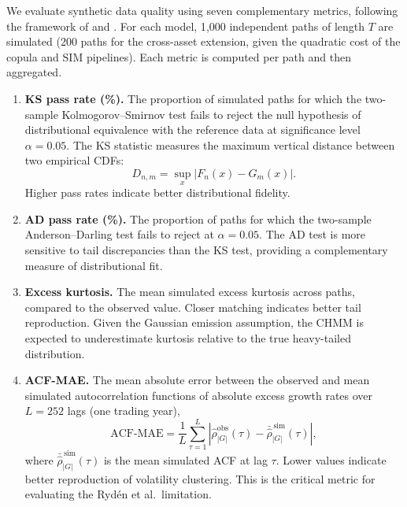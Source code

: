 We evaluate synthetic data quality using seven complementary metrics, following the framework of \cite{stenger2024thinking} and \cite{alswaidan2026hybrid}.
For each model, 1{,}000 independent paths of length $T$ are simulated (200 paths for the cross-asset extension, given the quadratic cost of the copula and SIM pipelines).
Each metric is computed per path and then aggregated.

\begin{enumerate}
    \item \textbf{KS pass rate (\%).}
    The proportion of simulated paths for which the two-sample Kolmogorov--Smirnov test \cite{kolmogorov1933, smirnov1948} fails to reject the null hypothesis of distributional equivalence with the reference data at significance level $\alpha = 0.05$.
    The KS statistic measures the maximum vertical distance between two empirical CDFs:
    \begin{equation}
        D_{n,m} = \sup_x |F_n(x) - G_m(x)|.
        \label{eq:ks}
    \end{equation}
    Higher pass rates indicate better distributional fidelity.

    \item \textbf{AD pass rate (\%).}
    The proportion of paths for which the two-sample Anderson--Darling test fails to reject at $\alpha = 0.05$.
    The AD test is more sensitive to tail discrepancies than the KS test, providing a complementary measure of distributional fit.

    \item \textbf{Excess kurtosis.}
    The mean simulated excess kurtosis across paths, compared to the observed value.
    Closer matching indicates better tail reproduction.
    Given the Gaussian emission assumption, the CHMM is expected to underestimate kurtosis relative to the true heavy-tailed distribution.

    \item \textbf{ACF-MAE.}
    The mean absolute error between the observed and mean simulated autocorrelation functions of absolute excess growth rates over $L = 252$ lags (one trading year),
    \begin{equation}
        \text{ACF-MAE} = \frac{1}{L} \sum_{\tau=1}^{L} \left|\hat{\rho}^{\text{obs}}_{|G|}(\tau) - \bar{\hat{\rho}}^{\,\text{sim}}_{|G|}(\tau)\right|,
        \label{eq:acf_mae}
    \end{equation}
    where $\bar{\hat{\rho}}^{\,\text{sim}}_{|G|}(\tau)$ is the mean simulated ACF at lag $\tau$.
    Lower values indicate better reproduction of volatility clustering.
    This is the critical metric for evaluating the Ryd\'{e}n et al.\ limitation.


\end{enumerate}
